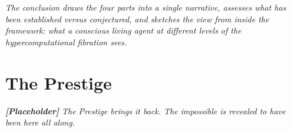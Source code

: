 \documentclass[12pt,openright,twoside]{book}
\theoremstyle{remark}
\begin{document}
\vspace{1em}
\begin{mdframed}[backgroundcolor=remarkgray, linecolor=gray!60,
                 linewidth=1pt, topline=false, rightline=false,
                 bottomline=false]
\small\itshape
The conclusion draws the four parts into a single narrative,
assesses what has been established versus conjectured, and
sketches the view from inside the framework: what a conscious
living agent at different levels of the hypercomputational
fibration sees.
\end{mdframed}

\bigskip


\part{The Prestige}

\vspace{1em}
\begin{mdframed}[backgroundcolor=remarkgray, linecolor=gray!60,
                 linewidth=1pt, topline=false, rightline=false,
                 bottomline=false]
\small\itshape
\textbf{[Placeholder]} The Prestige brings it back.
The impossible is revealed to have been here all along.
\end{mdframed}

\bigskip

\end{document}
